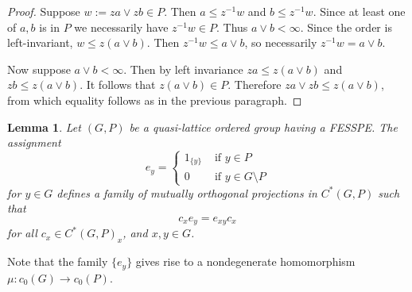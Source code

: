 \documentclass[12pt]{amsart}
\theoremstyle{plain}
\theoremstyle{remark}
\theoremstyle{definition}
\numberwithin{equation}{section}
\theoremstyle{plain}
\newtheorem{lem}[theorem]{Lemma}
\theoremstyle{definition}
\theoremstyle{remark}
\begin{document}
\begin{proof}
Suppose $w:=za\vee zb\in P$. Then $a\leq z^{-1}w$ and $b\leq z^{-1}w$. Since
at least one of $a,b$ is in $P$ we necessarily have $z^{-1}w\in P$. Thus $a\vee b< \infty$. Since the order is left-invariant, $w\leq z(a\vee b)$. Then $z^{-1}w\leq a\vee b$,
so necessarily $z^{-1}w=a\vee b$.

Now suppose $a\vee b<\infty$. Then
by left invariance $za\leq z(a\vee b)$ and $zb\leq z(a\vee b)$. It follows that
$z(a\vee b)\in P$. Therefore  $za\vee zb\leq z(a\vee b)$, from which equality follows as in the previous paragraph.
\end{proof}

\begin{lem}\label{prop:spectral-stuff}
Let $(G, P)$ be a quasi-lattice ordered group having a {FESSPE}. The assignment
\begin{equation}\label{eq:et}
e_y=\begin{cases}
1_{\{y\}}&\text{ if }y\in P\\
0&\text{ if }y\in G\setminus P
\end{cases}
\end{equation}
for $y\in G$ defines a family of mutually orthogonal projections in $C^*(G, P)$ such that
\begin{equation}\label{need-delta-inner}
c_xe_y=e_{xy}c_x
\end{equation}
for all $c_x\in C^*(G, P)_x$, and $x, y\in G$.
\end{lem}

Note that the family $\{e_y\}$ gives rise to a nondegenerate homomorphism
$\mu:c_0(G)\to c_0(P)$.
\end{document}
